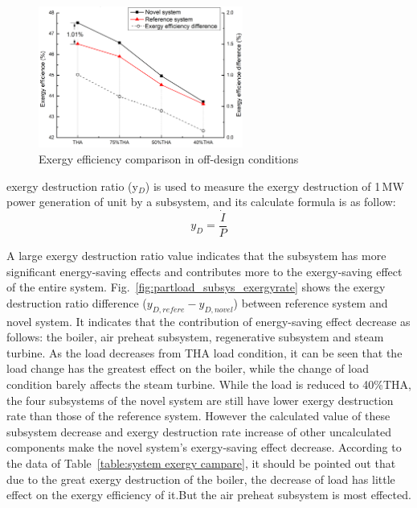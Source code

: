\documentclass[preprint,12pt]{elsarticle}
\begin{document}
\begin{figure}[htbp]
\centering
\includegraphics[width=0.6\textwidth]{fig/partload_efficiency.png}
\caption{Exergy efficiency comparison in off-design conditions} 
\label{fig:partload_efficiency}
\end{figure}
  exergy destruction ratio (y$_{D}$) is used to measure the exergy destruction of 1\,MW power generation of unit by a subsystem, and its calculate formula is as follow:
\begin{equation}
y_{D}=\frac{\dot{I}}{P}
\end{equation}

A large exergy destruction ratio value indicates that the subsystem has more significant energy-saving effects and contributes more to the exergy-saving effect of the entire system.
Fig.~\ref{fig:partload_subsys_exergyrate} shows the  exergy destruction ratio difference ($y_{D,refere}-y_{D,novel}$) between reference system and novel system.
It indicates that the contribution of energy-saving effect decrease as follows: the boiler, air preheat subsystem, regenerative subsystem and steam turbine.
As the load decreases from THA load condition, it can be seen that the load change has the greatest effect on the boiler, while the change of load condition barely affects the steam turbine.
While the load is reduced to 40\%THA, the four subsystems of the novel system are still have lower exergy destruction rate than those of the reference system.
However the calculated value of these subsystem decrease and exergy destruction rate increase of other uncalculated components make the novel system's exergy-saving effect decrease.
According to the data of Table~\ref{table:system exergy campare}, it should be pointed out that due to the great exergy destruction of the boiler, the decrease of load has little effect on the exergy efficiency of it.But the air preheat subsystem is most effected.
\end{document}
